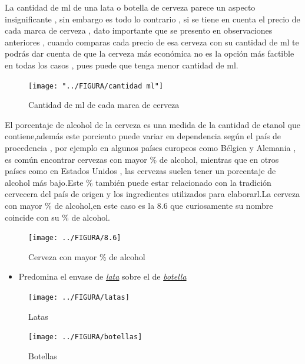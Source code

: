 \documentclass[10pt]{beamer}
\begin{document}
   	\begin{frame}
   		La cantidad de ml de una lata o botella de cerveza parece un aspecto insignificante , sin embargo es todo lo contrario , si se tiene en cuenta el precio de cada marca de cerveza , dato importante que se presento en observaciones anteriores , cuando comparas cada precio de esa cerveza con su cantidad de ml te podrás dar cuenta de que la cerveza más económica no es la opción más factible en todas los casos , pues puede que tenga menor cantidad de ml.
   		
   		\begin{figure}
   			\centering
   			\texttt{[image: "../FIGURA/cantidad ml"]}
   			\caption{Cantidad de ml de cada marca de cerveza}
   			\label{fig:cantidad-ml}
   		\end{figure}
   		
   	\end{frame}
   	
   	
   	\begin{frame}
   		El porcentaje de alcohol de la cerveza es una medida de la cantidad de etanol que contiene,además este porciento puede variar en dependencia según el país de procedencia , por ejemplo en algunos países europeos como Bélgica y Alemania , es común encontrar cervezas con mayor \% de alcohol, mientras que en otros países como en Estados Unidos , las cervezas suelen tener un porcentaje de alcohol más bajo.Este \% también puede estar relacionado con la tradición cervecera del país de origen y los ingredientes utilizados para elaborarl.La cerveza con mayor \% de alcohol,en este caso es la 8.6 que curiosamente su nombre coincide con su \% de alcohol.
   		
   		\begin{figure}
   			\centering
   			\texttt{[image: ../FIGURA/8.6]}
   			\caption{Cerveza con mayor \% de alcohol}
   			\label{fig:8}
   		\end{figure}
   		
   	\end{frame}
   	
   	
   	\begin{frame}
   		
   		\begin{itemize}
   			\item{Predomina el envase de \textit{\underline{lata}} sobre el de \textit{\underline{botella}}}
   		\end{itemize}
   		
   		\begin{figure}
   			\centering
   			\texttt{[image: ../FIGURA/latas]}
   			\caption{Latas}
   			\label{fig:latas}
   		\end{figure}
   		
   		
   		\begin{figure}
   			\centering
   			\texttt{[image: ../FIGURA/botellas]}
   			\caption{Botellas}
   			\label{fig:botellas}
   		\end{figure}
   		
   		
   	\end{frame}
   	
\end{document}
